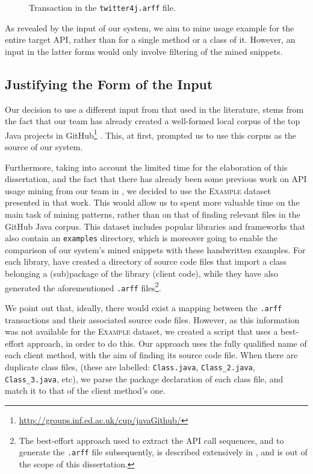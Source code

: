 \begin{figure}[h]
  
  \vspace{-10pt}
  \caption[Transaction in the \texttt{twitter4j.arff} file]{Transaction in the \texttt{twitter4j.arff} file.}
\label{listings:twitter4j-arff-transaction}
\end{figure}

As revealed by the input of our system, we aim to mine usage example for the entire target API, rather than for a single method or a class of it. However, an input in the latter forms would only involve filtering of the mined snippets.


\subsection{Justifying the Form of the Input}
\label{subsec:input-form}

Our decision to use a different input from that used in the literature, stems from the fact that our team has already created a well-formed local corpus of the top Java projects in GitHub\footnote{\url{http://groups.inf.ed.ac.uk/cup/javaGithub/}} \cite{Allamanis:2013}. This, at first, prompted us to use this corpus as the source of our system. 

Furthermore, taking into account the limited time for the elaboration of this dissertation, and the fact that there has already been some previous work on API usage mining from our team in \cite{Fowkes2:2015}, we decided to use the \textsc{Example} dataset presented in that work. This would allow us to spent more valuable time on the main task of mining patterns, rather than on that of finding relevant files in the GitHub Java corpus. This dataset includes popular libraries and frameworks that also contain an \texttt{examples} directory, which is moreover going to enable the comparison of our system's mined snippets with these handwritten examples. For each library,  have created a directory of source code files that import a class belonging a (sub)package of the library (client code), while they have also generated the aforementioned \texttt{.arff} files\footnote{The best-effort approach used to extract the API call sequences, and to generate the \texttt{.arff} file subsequently, is described extensively in \cite{Fowkes2:2015}, and is out of the scope of this dissertation.}.

We point out that, ideally, there would exist a mapping between the \texttt{.arff} transactions and their associated source code files. However, as this information was not available for the \textsc{Example} dataset, we created a script that uses a best-effort approach, in order to do this. Our approach uses the fully qualified name of each client method, with the aim of finding its source code file. When there are duplicate class files, (these are labelled: \texttt{Class.java}, \texttt{Class\_2.java}, \texttt{Class\_3.java}, etc), we parse the package declaration of each class file, and match it to that of the client method's one.


